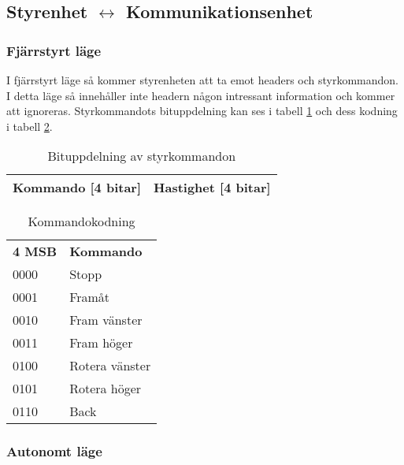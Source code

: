 \subsection{Styrenhet $\longleftrightarrow$ Kommunikationsenhet}
\subsubsection{Fjärrstyrt läge}
I fjärrstyrt läge så kommer styrenheten att ta emot headers och styrkommandon. I detta läge så 
innehåller inte headern någon intressant information och kommer att ignoreras. Styrkommandots bituppdelning kan ses i 
tabell \ref{tab:styrbitar} och dess kodning i tabell \ref{tab:styrkommando}.
 
\begin{table}[hb] 
  \centering
  \begin{tabular}{| c | c |}
    \hline
    Kommando [4 bitar] & Hastighet [4 bitar] \\ \hline
  \end{tabular}
  \caption{Bituppdelning av styrkommandon}
  \label{tab:styrbitar}
\end{table}

\begin{table}[hb] 
  \centering
  \begin{tabular}{l l}
    \textbf{4 MSB} & \textbf{Kommando} \\
    0000 & Stopp \\
    0001 & Framåt \\
    0010 & Fram vänster \\
    0011 & Fram höger \\
    0100 & Rotera vänster \\
    0101 & Rotera höger \\
    0110 & Back \\
  \end{tabular}
  \caption{Kommandokodning}
  \label{tab:styrkommando}
\end{table}

\subsubsection{Autonomt läge}

